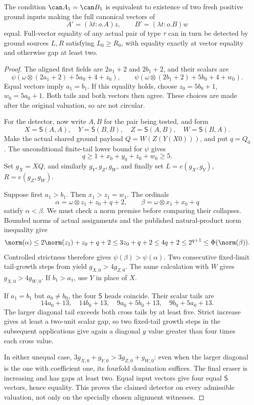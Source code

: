 \begin{lemma}\label{lem:functional-detector}
The condition $\can A_1=\can B_1$ is equivalent to existence of two fresh
positive ground inputs making the full canonical vectors of
\[
 A'=(\lambda t:o.A)z,\qquad B'=(\lambda t:o.B)w
\]
equal.  Full-vector equality of any actual pair of type $\tau$ can in turn
be detected by ground sources $L,R$ satisfying $L_0\ge R_0$, with equality
exactly at vector equality and otherwise gap at least two.
\end{lemma}
\begin{proof}
The aligned first fields are $2a_1+2$ and $2b_1+2$, and their scalars are
\[
 \psi(\omega\otimes(2a_1+2)+5a_0+4+z_0),\qquad
 \psi(\omega\otimes(2b_1+2)+5b_0+4+w_0).
\]
Equal vectors imply $a_1=b_1$.  If this equality holds, choose
$z_0=5b_0+1$, $w_0=5a_0+1$.  Both tails and both vectors then agree.
These choices are made after the original valuation, so are not circular.

For the detector, now write $A,B$ for the pair being tested, and form
\[
 X=\mathsf S(A,A),\quad Y=\mathsf S(B,B),\quad
 Z=\mathsf S(A,B),\quad W=\mathsf S(B,A).
\]
Make the actual shared ground payload
$Q=W(Z(Y(X0)))$, and put $q=Q_0$.
The unconditional finite-tail lower bound for $\psi$ gives
\[
 q\ge1+x_0+y_0+z_0+w_0\ge5.
\]
Set $g_X=XQ$, and similarly $g_Y,g_Z,g_W$, and finally set
$L=e(g_X,g_Y)$, $R=e(g_Z,g_W)$.

Suppose first $a_1>b_1$.  Then $x_1>z_1=w_1$.  The ordinals
\[
 \alpha=\omega\otimes z_1+z_0+q+2,
 \qquad \beta=\omega\otimes x_1+x_0+q
\]
satisfy $\alpha<\beta$.  We must check a norm premise before comparing
their collapses.  Bounded norms of actual assignments and the published
natural-product norm inequality \cite[Propositions 2.2--2.3]{ww} give
\[
 \norm(\alpha)\le2\norm(z_1)+z_0+q+2
 \le3z_0+q+2\le4q+2
 \le2^{q+1}\le\Phi(\norm(\beta)).
\]
Controlled strictness therefore gives $\psi(\beta)>\psi(\alpha)$.
Two consecutive fixed-limit tail-growth steps from \cite{wwfoundations}
yield $g_{X,0}>4g_{Z,0}$.  The same calculation with $W$ gives
$g_{X,0}>4g_{W,0}$.  If $b_1>a_1$, use $Y$ in place of $X$.

If $a_1=b_1$ but $a_0\ne b_0$, the four $\mathsf S$ heads coincide.
Their scalar tails are
\[
 14a_0+13,\quad14b_0+13,\quad
 9a_0+5b_0+13,\quad9b_0+5a_0+13.
\]
The larger diagonal tail exceeds both cross tails by at least five.
Strict increase gives at least a two-unit scalar gap, so two fixed-tail
growth steps in the subsequent applications give again a diagonal $g$
value greater than four times each cross value.

In either unequal case,
$3g_{X,0}+g_{Y,0}>3g_{Z,0}+g_{W,0}$: even when the larger diagonal
is the one with coefficient one, its fourfold domination suffices.
The final eraser is increasing and has gaps at least two.
Equal input vectors give four equal $\mathsf S$ vectors, hence equality.
This proves the claimed detector on every admissible valuation, not only
on the specially chosen alignment witnesses.
\end{proof}

